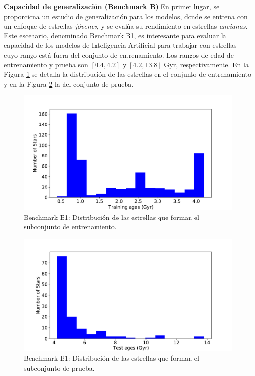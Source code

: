 \textbf{Capacidad de generalización (Benchmark B)} {} En primer lugar, se proporciona un estudio de generalización para los modelos, donde se entrena con un enfoque de estrellas \emph{jóvenes}, y se evalúa su rendimiento en estrellas \emph{ancianas}. Este escenario, denominado Benchmark B1, es interesante para evaluar la capacidad de los modelos de Inteligencia Artificial para trabajar con estrellas cuyo rango está fuera del conjunto de entrenamiento. Los rangos de edad de entrenamiento y prueba son $[0.4,4.2]$ y $[4.2,13.8]$ Gyr, respectivamente. En la Figura \ref{fig:benchB1_train} se detalla la distribución de las estrellas en el conjunto de entrenamiento y en la Figura \ref{fig:benchB1_test} la del conjunto de prueba.

\begin{figure}[H]
\begin{center}
 \includegraphics[width=0.8\linewidth]{Figuras/Experimentos/B_B1_training.pdf}
\end{center}
\caption{Benchmark B1: Distribución de las estrellas que forman el subconjunto de entrenamiento.}
 \label{fig:benchB1_train}
\end{figure}

\begin{figure}[H]
\begin{center}
 \includegraphics[width=0.8\linewidth]{Figuras/Experimentos/B_B1_test.pdf}
\end{center}
\caption{Benchmark B1: Distribución de las estrellas que forman el subconjunto de prueba.}
 \label{fig:benchB1_test}
\end{figure}

